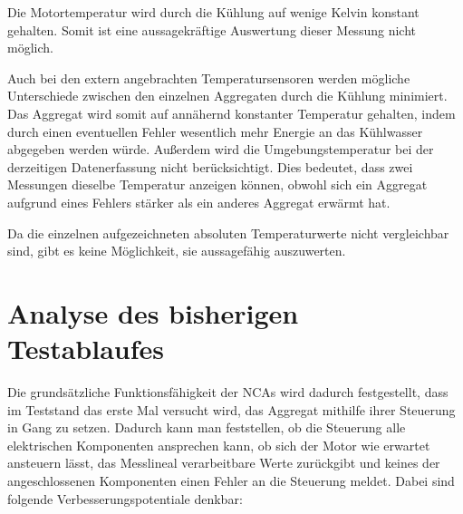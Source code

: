 Die Motortemperatur wird durch die Kühlung auf wenige Kelvin konstant gehalten. Somit ist eine aussagekräftige Auswertung dieser Messung nicht möglich.

Auch bei den extern angebrachten Temperatursensoren werden mögliche Unterschiede zwischen den einzelnen Aggregaten durch die Kühlung minimiert. Das Aggregat wird somit auf annähernd konstanter Temperatur gehalten, indem durch einen eventuellen Fehler wesentlich mehr Energie an das Kühlwasser abgegeben werden würde. Außerdem wird die Umgebungstemperatur bei der derzeitigen Datenerfassung nicht berücksichtigt. Dies bedeutet, dass zwei Messungen dieselbe Temperatur anzeigen können, obwohl sich ein Aggregat aufgrund eines Fehlers stärker als ein anderes Aggregat erwärmt hat.



Da die einzelnen aufgezeichneten absoluten Temperaturwerte nicht vergleichbar sind, gibt es keine Möglichkeit, sie aussagefähig auszuwerten.





\section{Analyse des bisherigen Testablaufes} \label{ch:Kritik_Testlauf}







Die grundsätzliche Funktionsfähigkeit der NCAs wird dadurch festgestellt, dass im Teststand das erste Mal versucht wird, das Aggregat mithilfe ihrer Steuerung in Gang zu setzen. Dadurch kann man feststellen, ob die Steuerung alle elektrischen Komponenten ansprechen kann, ob sich der Motor wie erwartet ansteuern lässt, das Messlineal verarbeitbare Werte zurückgibt und keines der angeschlossenen Komponenten einen Fehler an die Steuerung meldet. Dabei sind folgende Verbesserungspotentiale denkbar:

